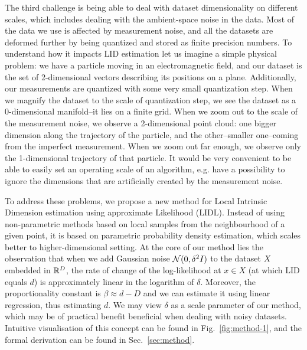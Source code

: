 The third challenge is being able to deal with dataset dimensionality on different scales, which includes dealing with the ambient-space noise in the data. Most of the data we use is affected by measurement noise, and all the datasets are deformed further by being quantized and stored as finite precision numbers. 
To understand how it impacts LID estimation let us imagine a simple physical problem: we have a particle moving in an electromagnetic field, and our dataset is the set of 2-dimensional vectors describing its positions on a plane. 
Additionally, our measurements are quantized with some very small quantization step. 
When we magnify the dataset to the scale of quantization step, we see the dataset as a 0-dimensional manifold--it lies on a finite grid. When we zoom out to the scale of the measurement noise, we observe a 2-dimensional point cloud: one bigger dimension along the trajectory of the particle, and the other--smaller one--coming from the imperfect measurement. When we zoom out far enough, we observe only the 1-dimensional trajectory of that particle. It would be very convenient to be able to easily set an operating scale of an algorithm, e.g. have a possibility to ignore the dimensions that are artificially created by the measurement noise.

To address these problems, we propose a new method for Local Intrinsic Dimension estimation using approximate Likelihood (LIDL). Instead of using non-parametric methods based on local samples from the neighbourhood of a given point, it is based on parametric probability density estimation, which scales better to higher-dimensional setting. 
At the core of our method lies the observation that when we add Gaussian noise $\mathcal{N}(0,\delta^2 I)$ to the dataset $X$ embedded in $\mathbb{R}^D$, the rate of change of the log-likelihood at $x \in X$ (at which LID equals $d$) is approximately linear in the logarithm of $\delta$. Moreover, the proportionality constant is $\beta \approx  d - D$ and we can estimate it using linear regression, thus estimating $d$. 
We may view $\delta$ as a scale parameter of our method, which may be of practical benefit beneficial when dealing with noisy datasets. Intuitive visualisation of this concept can be found in Fig.~\ref{fig:method-1}, and the formal derivation can be found in Sec.~\ref{sec:method}.

